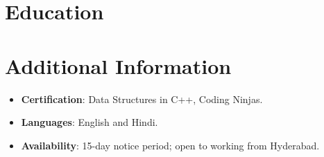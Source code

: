 \documentclass[11pt,a4paper,sans]{moderncv}
\begin{document}
\section{Education}
\vspace{1pt}


\section{Additional Information}
\vspace{1pt}
\begin{itemize}
\item {\textbf{Certification}: Data Structures in C++, Coding Ninjas.}
\item {\textbf{Languages}: English and Hindi.}
\item {\textbf{Availability}: 15-day notice period; open to working from Hyderabad.}
\end{itemize}
\end{document}

